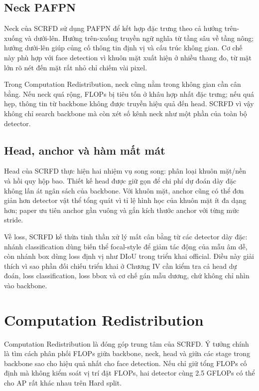 \subsection{Neck PAFPN}

Neck của SCRFD sử dụng PAFPN \cite{liu2018panet} để kết hợp đặc trưng theo cả hướng trên-xuống và dưới-lên. Hướng trên-xuống truyền ngữ nghĩa từ tầng sâu về tầng nông; hướng dưới-lên giúp củng cố thông tin định vị và cấu trúc không gian. Cơ chế này phù hợp với face detection vì khuôn mặt xuất hiện ở nhiều thang đo, từ mặt lớn rõ nét đến mặt rất nhỏ chỉ chiếm vài pixel.

Trong Computation Redistribution, neck cũng nằm trong không gian cần cân bằng. Nếu neck quá rộng, FLOPs bị tiêu tốn ở khâu hợp nhất đặc trưng; nếu quá hẹp, thông tin từ backbone không được truyền hiệu quả đến head. SCRFD vì vậy không chỉ search backbone mà còn xét số kênh neck như một phần của toàn bộ detector.

\subsection{Head, anchor và hàm mất mát}

Head của SCRFD thực hiện hai nhiệm vụ song song: phân loại khuôn mặt/nền và hồi quy hộp bao. Thiết kế head được giữ gọn để chi phí dự đoán dày đặc không lấn át ngân sách của backbone. Với khuôn mặt, anchor cũng có thể đơn giản hơn detector vật thể tổng quát vì tỉ lệ hình học của khuôn mặt ít đa dạng hơn; paper ưu tiên anchor gần vuông và gắn kích thước anchor với từng mức stride.

Về loss, SCRFD kế thừa tinh thần xử lý mất cân bằng từ các detector dày đặc: nhánh classification dùng biến thể focal-style để giảm tác động của mẫu âm dễ, còn nhánh box dùng loss định vị như DIoU trong triển khai official. Điều này giải thích vì sao phần đối chiếu triển khai ở Chương IV cần kiểm tra cả head dự đoán, loss classification, loss bbox và cơ chế gán mẫu dương, chứ không chỉ nhìn vào backbone.

\section{Computation Redistribution}

Computation Redistribution là đóng góp trung tâm của SCRFD. Ý tưởng chính là tìm cách phân phối FLOPs giữa backbone, neck, head và giữa các stage trong backbone sao cho hiệu quả nhất cho face detection. Nếu chỉ giữ tổng FLOPs cố định mà không kiểm soát vị trí đặt FLOPs, hai detector cùng 2.5 GFLOPs có thể cho AP rất khác nhau trên Hard split.

